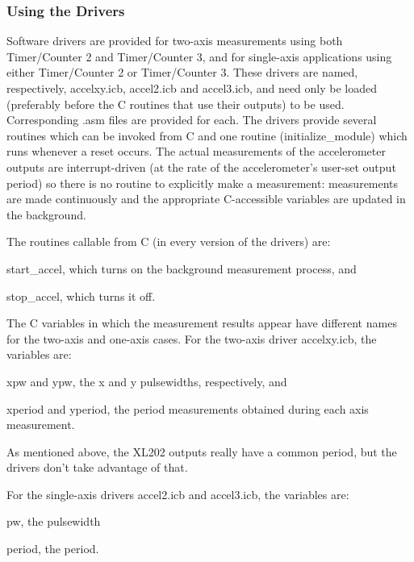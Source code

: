 \documentclass{article}
\begin{document}
\subsubsection{Using the Drivers}

Software drivers are provided for two-axis measurements using both
Timer/Counter 2 and Timer/Counter 3, and for single-axis applications
using either Timer/Counter 2 or Timer/Counter 3.  These drivers are
named, respectively, accelxy.icb, accel2.icb and accel3.icb, and need
only be loaded (preferably before the C routines that use their
outputs) to be used.  Corresponding .asm files are provided for each.
The drivers provide several routines which can be invoked from C and
one routine (initialize\_module) which runs whenever a reset occurs.
The actual measurements of the accelerometer outputs are
interrupt-driven (at the rate of the accelerometer's user-set output
period) so there is no routine to explicitly make a measurement:
measurements are made continuously and the appropriate C-accessible
variables are updated in the background. 

The routines callable from C (in every version of the drivers) are:
\begin{description}
  \item{start\_accel}, which turns on the background measurement process, and
  \item{stop\_accel}, which turns it off.
\end{description}

The C variables in which the measurement results appear have different
names for the two-axis and one-axis cases.  For the two-axis driver
accelxy.icb, the variables are: 
\begin{description}
  \item{xpw and ypw}, the x and y pulsewidths, respectively, and
  \item{xperiod and yperiod}, the period measurements obtained during each
  axis measurement. 
\end{description}

As mentioned above, the XL202 outputs really have a common period, but
the drivers don't take advantage of that. 

For the single-axis drivers accel2.icb and accel3.icb, the variables are:
\begin{description}
  \item{pw}, the pulsewidth
  \item{period}, the period.
\end{description}
\end{document}
